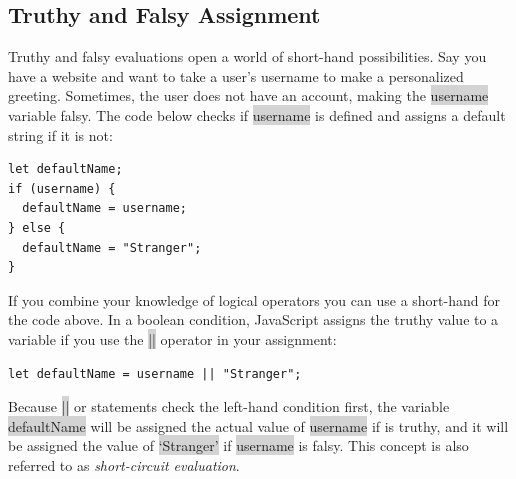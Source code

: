 \documentclass[11pt]{article}
\begin{document}
\subsection{Truthy and Falsy Assignment}
Truthy and falsy evaluations open a world of short-hand possibilities. Say you have a website and want to take a user’s username to make a personalized greeting. Sometimes, the user does not have an account, making the \colorbox{lightgray}{username} variable falsy. The code below checks if \colorbox{lightgray}{username} is defined and assigns a default string if it is not:
\begin{lstlisting}
let defaultName;
if (username) {
  defaultName = username;
} else {
  defaultName = "Stranger";
}
\end{lstlisting}
If you combine your knowledge of logical operators you can use a short-hand for the code above. In a boolean condition, JavaScript assigns the truthy value to a variable if you use the \colorbox{lightgray}{||} operator in your assignment:
\begin{lstlisting}
let defaultName = username || "Stranger";
\end{lstlisting}
Because \colorbox{lightgray}{||} or statements check the left-hand condition first, the variable \colorbox{lightgray}{defaultName} will be assigned the actual value of \colorbox{lightgray}{username} if is truthy, and it will be assigned the value of \colorbox{lightgray}{`Stranger'} if \colorbox{lightgray}{username} is falsy. This concept is also referred to as \textit{short-circuit evaluation}.
\end{document}
